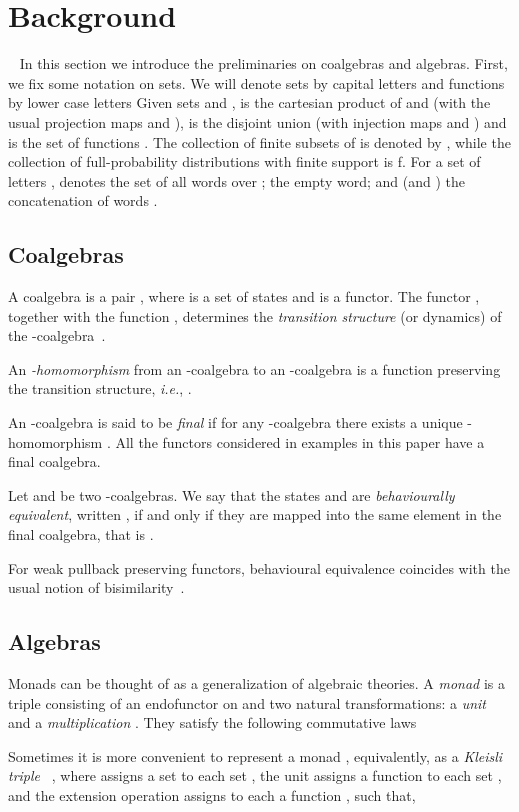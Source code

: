 \documentclass{LMCS}
\begin{document}
\section{Background}~\label{sec:prelim}
In this section we introduce the preliminaries on coalgebras and
algebras. First, we fix some notation on sets. We will denote sets
by capital letters  and functions by lower case letters
 Given sets  and ,  is the cartesian
product of  and  (with the usual projection maps  and
),  is the disjoint union (with injection maps
 and ) and  is the set of functions . The collection of finite subsets of  is denoted by , while the collection of full-probability distributions with finite
support is f. For a set of letters
,  denotes the set of all words over ;  the
empty word; and  (and ) the concatenation of
words .

\subsection{Coalgebras} A coalgebra is a pair , where  is a set of states and  is a functor.
 The functor , together with the
function , determines the {\em transition structure} (or
dynamics) of the -coalgebra~\cite{Rutten00}.

An {\em -homomorphism\/} from an -coalgebra  to an
-coalgebra  is a function  preserving the
transition structure, {\em i.e.}, .

An -coalgebra  is said to be {\em final} if for
any -coalgebra  there exists a unique -homomorphism
 .
 All the functors considered in examples in this paper have a final coalgebra.

Let  and  be two -coalgebras. We say that the
states  and  are {\em behaviourally equivalent},
written , if and only if they are mapped into the same
element in the final coalgebra, that is .

For weak pullback preserving functors, behavioural equivalence coincides with the usual notion 
of bisimilarity~\cite{Rutten00}.
   
\subsection{Algebras}
Monads can be thought of as a generalization of algebraic theories.
A \emph{monad}  is a triple consisting of an
endofunctor  on  and two natural transformations: a
\emph{unit}  and a \emph{multiplication} .
They satisfy the following commutative laws

Sometimes it is more convenient to represent a monad , equivalently, as a \emph{Kleisli triple}
~\cite{Man76}, where  assigns a set  to each
set , the unit  assigns a function   to each set ,
and the extension operation   assigns  to each
 a function , such that,
\end{document}
